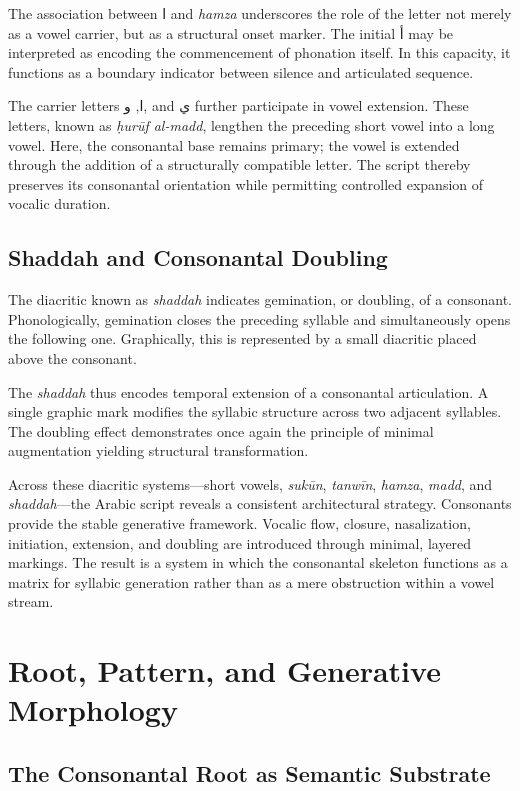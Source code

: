 \documentclass[11pt]{article}
\begin{document}
The association between \textarabic{ا} and \textit{hamza} underscores the role of the letter not merely as a vowel carrier, but as a structural onset marker. The initial \textarabic{أ} may be interpreted as encoding the commencement of phonation itself. In this capacity, it functions as a boundary indicator between silence and articulated sequence.

The carrier letters \textarabic{ا}, \textarabic{و}, and \textarabic{ي} further participate in vowel extension. These letters, known as \textit{ḥurūf al-madd}, lengthen the preceding short vowel into a long vowel. Here, the consonantal base remains primary; the vowel is extended through the addition of a structurally compatible letter. The script thereby preserves its consonantal orientation while permitting controlled expansion of vocalic duration.

\subsection{Shaddah and Consonantal Doubling}

The diacritic known as \textit{shaddah} indicates gemination, or doubling, of a consonant. Phonologically, gemination closes the preceding syllable and simultaneously opens the following one. Graphically, this is represented by a small diacritic placed above the consonant.

The \textit{shaddah} thus encodes temporal extension of a consonantal articulation. A single graphic mark modifies the syllabic structure across two adjacent syllables. The doubling effect demonstrates once again the principle of minimal augmentation yielding structural transformation.

Across these diacritic systems—short vowels, \textit{sukūn}, \textit{tanwīn}, \textit{hamza}, \textit{madd}, and \textit{shaddah}—the Arabic script reveals a consistent architectural strategy. Consonants provide the stable generative framework. Vocalic flow, closure, nasalization, initiation, extension, and doubling are introduced through minimal, layered markings. The result is a system in which the consonantal skeleton functions as a matrix for syllabic generation rather than as a mere obstruction within a vowel stream.

\section{Root, Pattern, and Generative Morphology}

\subsection{The Consonantal Root as Semantic Substrate}
\end{document}
